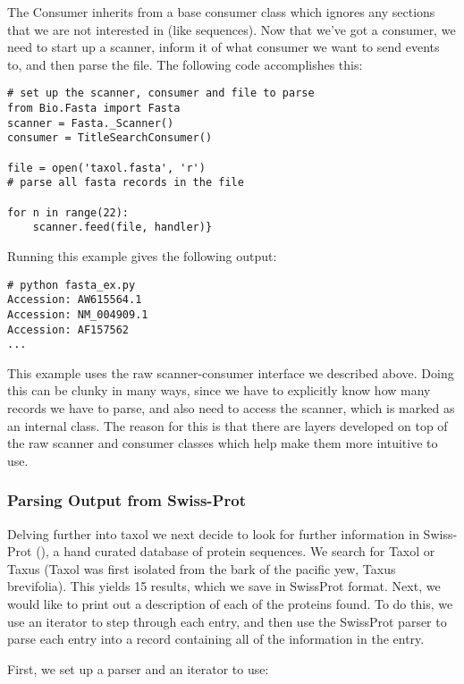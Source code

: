\documentclass[dvips]{article}
\begin{document}
The Consumer inherits from a base consumer class which ignores any sections that we are not interested in (like sequences). Now that we've got a consumer, we need to start up a scanner, inform it of what consumer we want to send events to, and then parse the file. The following code accomplishes this:

\begin{verbatim}
# set up the scanner, consumer and file to parse
from Bio.Fasta import Fasta
scanner = Fasta._Scanner()
consumer = TitleSearchConsumer()

file = open('taxol.fasta', 'r')
# parse all fasta records in the file

for n in range(22):
    scanner.feed(file, handler)}
\end{verbatim}

Running this example gives the following output:

\begin{verbatim}
# python fasta_ex.py
Accession: AW615564.1
Accession: NM_004909.1
Accession: AF157562
...
\end{verbatim}


This example uses the raw scanner-consumer interface we described above. Doing this can be clunky in many ways, since we have to explicitly know how many records we have to parse, and also need to access the scanner, which is marked as an internal class. The reason for this is that there are layers developed on top of the raw scanner and consumer classes which help make them more intuitive to use.


\subsubsection{Parsing Output from Swiss-Prot}


Delving  further into taxol  we next decide to look for further information in Swiss-Prot (), a hand curated database of protein sequences. We search for  Taxol or Taxus (Taxol was first isolated from the bark of the pacific yew, Taxus brevifolia). This  yields 15 results, which we save in SwissProt format. Next, we would like to print out a description of each of the proteins found. To do this, we use an iterator to step through each entry, and then use the SwissProt parser to parse each entry into a record containing all of the information in the entry.


First, we set up a parser and an iterator to use:
\end{document}

